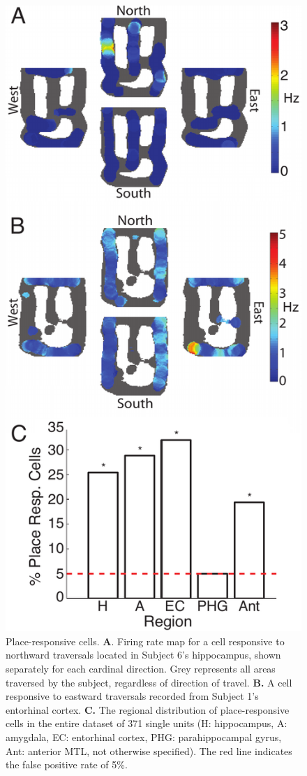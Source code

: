 \begin{figure}
\centering
    \includegraphics[width=.5\textwidth]{./tex/dboy/figs/fig2}
  \caption[Place-responsive cells]{Place-responsive cells.  \textbf{A}. Firing rate map for a cell responsive to northward traversals located in Subject 6's hippocampus, shown separately for each cardinal direction. Grey represents all areas traversed by the subject, regardless of direction of travel. \textbf{B.} A cell responsive to eastward traversals recorded from Subject 1's entorhinal cortex. \textbf{C.} The regional distribution of place-responsive cells in the entire dataset of 371 single units (H: hippocampus, A: amygdala, EC: entorhinal cortex, PHG: parahippocampal gyrus, Ant: anterior MTL, not otherwise specified).  The red line indicates the false positive rate of 5\%.}
\label{fig:place_ex}
\end{figure}

